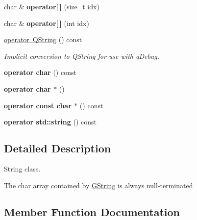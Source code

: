 \begin{DoxyCompactItemize}
char \& {\bfseries operator\mbox{[}$\,$\mbox{]}} (size\+\_\+t idx)
\item 
\mbox{\label{classrev_1_1_g_string_abde4322ef8d69b16d6e491b24004157a}} 
char \& {\bfseries operator\mbox{[}$\,$\mbox{]}} (int idx)
\item 
\mbox{\label{classrev_1_1_g_string_abc2181f33ed194181c6d35a44d9b0ff9}} 
\mbox{\hyperlink{classrev_1_1_g_string_abc2181f33ed194181c6d35a44d9b0ff9}{operator Q\+String}} () const
\begin{DoxyCompactList}\small\item\em Implicit conversion to Q\+String for use with q\+Debug. \end{DoxyCompactList}\item 
\mbox{\label{classrev_1_1_g_string_a7a931e99b537cd1f7278589752e28bf5}} 
{\bfseries operator char} () const
\item 
\mbox{\label{classrev_1_1_g_string_a6758626848f92b9c65e9df3604504612}} 
{\bfseries operator char $\ast$} ()
\item 
\mbox{\label{classrev_1_1_g_string_ad010ff59b2d2995197a78da7338fecfe}} 
{\bfseries operator const char $\ast$} () const
\item 
\mbox{\label{classrev_1_1_g_string_aa91d9d2062d2498b53330785995d1a7a}} 
{\bfseries operator std\+::string} () const
\end{DoxyCompactItemize}


\subsection{Detailed Description}
String class. 

The char array contained by \mbox{\hyperlink{classrev_1_1_g_string}{G\+String}} is always null-\/terminated 

\subsection{Member Function Documentation}
\mbox{\label{classrev_1_1_g_string_ac049dc925821c651e98433a811100a4d}} 
